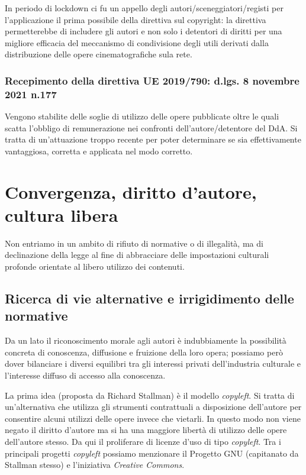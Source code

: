 In periodo di lockdown ci fu un appello degli autori/sceneggiatori/registi per l'applicazione il prima possibile della direttiva sul copyright: la direttiva permetterebbe di includere gli autori e non solo i detentori di diritti per una migliore efficacia del meccanismo di condivisione degli utili derivati dalla distribuzione delle opere cinematografiche sula rete. 

\subsubsection{Recepimento della direttiva UE 2019/790: d.lgs. 8 novembre 2021 n.177}
Vengono stabilite delle soglie di utilizzo delle opere pubblicate oltre le quali scatta l'obbligo di remunerazione nei confronti dell'autore/detentore del DdA.
Si tratta di un'attuazione troppo recente per poter determinare se sia effettivamente vantaggiosa, corretta e applicata nel modo corretto. 

\section{Convergenza, diritto d'autore, cultura libera}
Non entriamo in un ambito di rifiuto di normative o di illegalità, ma di declinazione della legge al fine di abbracciare delle impostazioni culturali profonde orientate al libero utilizzo dei contenuti. 

\subsection{Ricerca di vie alternative e irrigidimento delle normative}

Da un lato il riconoscimento morale agli autori è indubbiamente la possibilità concreta di conoscenza, diffusione e fruizione della loro opera; possiamo però dover bilanciare i diversi equilibri tra gli interessi privati dell'industria culturale e l'interesse diffuso di accesso alla conoscenza. 

La prima idea (proposta da Richard Stallman) è il modello \textit{copyleft}. Si tratta di un'alternativa che utilizza gli strumenti contrattuali a disposizione dell'autore per consentire alcuni utilizzi delle opere invece che vietarli. In questo modo non viene negato il diritto d'autore ma si ha una maggiore libertà di utilizzo delle opere dell'autore stesso. 
Da qui il proliferare di licenze d'uso di tipo \textit{copyleft}. 
Tra i principali progetti \textit{copyleft} possiamo menzionare il Progetto GNU (capitanato da Stallman stesso) e l'iniziativa \textit{Creative Commons}.

